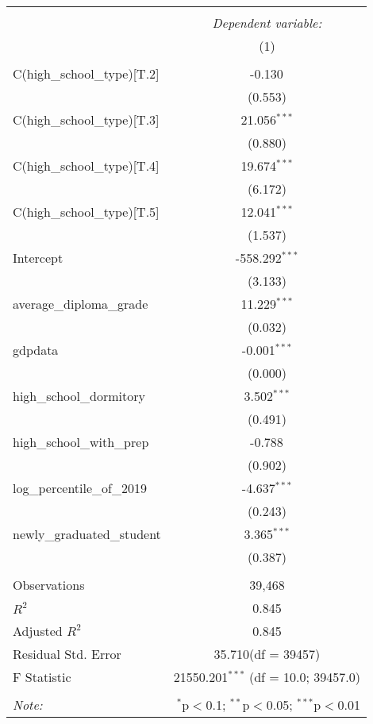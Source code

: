 \begin{table}[!htbp] \centering
\begin{tabular}{@{\extracolsep{5pt}}lc}
\\[-1.8ex]\hline
\hline \\[-1.8ex]
& \multicolumn{1}{c}{\textit{Dependent variable:}} \
\cr \cline{1-2}
\\[-1.8ex] & (1) \\
\hline \\[-1.8ex]
 C(high_school_type)[T.2] & -0.130$^{}$ \\
  & (0.553) \\
 C(high_school_type)[T.3] & 21.056$^{***}$ \\
  & (0.880) \\
 C(high_school_type)[T.4] & 19.674$^{***}$ \\
  & (6.172) \\
 C(high_school_type)[T.5] & 12.041$^{***}$ \\
  & (1.537) \\
 Intercept & -558.292$^{***}$ \\
  & (3.133) \\
 average_diploma_grade & 11.229$^{***}$ \\
  & (0.032) \\
 gdpdata & -0.001$^{***}$ \\
  & (0.000) \\
 high_school_dormitory & 3.502$^{***}$ \\
  & (0.491) \\
 high_school_with_prep & -0.788$^{}$ \\
  & (0.902) \\
 log_percentile_of_2019 & -4.637$^{***}$ \\
  & (0.243) \\
 newly_graduated_student & 3.365$^{***}$ \\
  & (0.387) \\
\hline \\[-1.8ex]
 Observations & 39,468 \\
 $R^2$ & 0.845 \\
 Adjusted $R^2$ & 0.845 \\
 Residual Std. Error & 35.710(df = 39457)  \\
 F Statistic & 21550.201$^{***}$ (df = 10.0; 39457.0) \\
\hline
\hline \\[-1.8ex]
\textit{Note:} & \multicolumn{1}{r}{$^{*}$p$<$0.1; $^{**}$p$<$0.05; $^{***}$p$<$0.01} \\
\end{tabular}
\end{table}